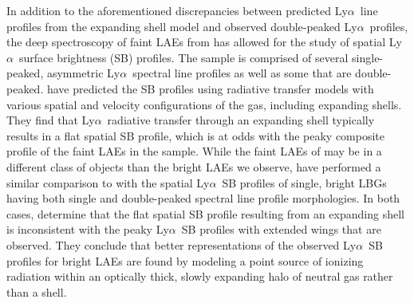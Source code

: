 \documentclass{emulateapj}
\newcommand{\lya}{Ly$\alpha$}
\begin{document}
In addition to the aforementioned discrepancies between predicted \lya\ line profiles from the expanding shell model and observed double-peaked \lya\ profiles, the deep spectroscopy of faint LAEs from \citet{rauch2008} has allowed for the study of spatial \lya\ surface brightness (SB) profiles. The \citet{rauch2008} sample is comprised of several single-peaked, asymmetric \lya\ spectral line profiles as well as some that are double-peaked. \citet{barnes2010} have predicted the SB profiles using radiative transfer models with various spatial and velocity configurations of the gas, including expanding shells. They find that \lya\ radiative transfer through an expanding shell typically results in a flat spatial SB profile, which is at odds with the peaky composite profile of the faint LAEs in the \citet{rauch2008} sample. While the faint LAEs of \citet{rauch2008} may be in a different class of objects than the bright LAEs we observe, \citet{rauch2011} have performed a similar comparison to \citet{barnes2010} with the spatial \lya\ SB profiles of single, bright LBGs having both single and double-peaked spectral line profile morphologies. In both cases, \citet{rauch2011} determine that the flat spatial SB profile resulting from an expanding shell is inconsistent with the peaky \lya\ SB profiles with extended wings that are observed. They conclude that better representations of the observed \lya\ SB profiles for bright LAEs are found by modeling a point source of ionizing radiation within an optically thick, slowly expanding halo of neutral gas rather than a shell. 
\end{document}
